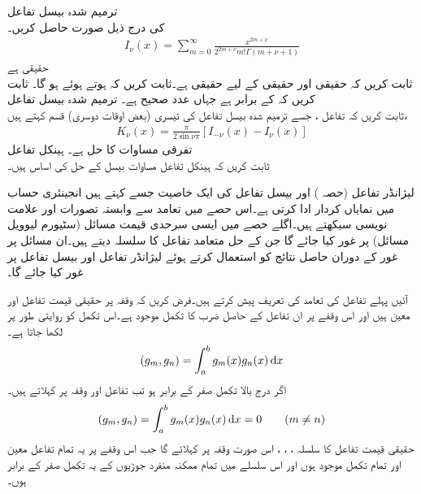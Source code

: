 \quad ترمیم شدہ بیسل تفاعل\\
 کی درج ذیل صورت حاصل کریں۔
\begin{align}
I_{\nu}(x)=\sum_{m=0}^{\infty}\frac{x^{2m+\nu}}{2^{2m+\nu}m!\Gamma(m+\nu+1)}
\end{align}
\quad {} حقیقی ہے\\
ثابت کریں کہ حقیقی  اور حقیقی  کے لیے  حقیقی ہے۔ثابت کریں کہ  ہوتے ہوئے  ہو گا۔ ثابت کریں کہ  کے برابر ہے جہاں  عدد صحیح ہے۔
\quad ترمیم شدہ بیسل تفاعل\\
ثابت کریں کہ تفاعل ، جسے ترمیم شدہ بیسل تفاعل کی تیسری (بعض اوقات دوسری) قسم کہتے ہیں،
\begin{align}
K_{\nu}(x)=\frac{\pi}{2\sin \nu\pi}[I_{-\nu}(x)-I_{\nu}(x)]
\end{align}
تفرقی مساوات  کا حل ہے۔ 
\quad ہینکل تفاعل\\
ثابت کریں کہ ہینکل تفاعل  مساوات بیسل کے حل کی اساس ہیں۔ 

لیژانڈر تفاعل (حصہ ) اور بیسل تفاعل کی ایک خاصیت جسے  کہتے ہیں انجینئری حساب میں نمایاں کردار ادا کرتی ہے۔اس حصے میں تعامد سے وابستہ تصورات اور  علامت نویسی سیکھتے ہیں۔اگلے حصے میں  ایسی سرحدی قیمت مسائل (سٹیورم لیوویل مسائل) پر غور کیا جائے گا جن کے حل متعامد تفاعل کا سلسلہ دیتے ہیں۔ان مسائل  پر غور کے دوران حاصل نتائج کو استعمال کرتے ہوئے لیژانڈر تفاعل اور بیسل تفاعل پر غور کیا جائے گا۔

آئیں پہلے تفاعل کی تعامد کی تعریف پیش کرتے ہیں۔فرض کریں کہ وقفہ  پر حقیقی قیمت تفاعل  اور  معین ہیں اور اس وقفے پر ان تفاعل کے حاصل ضرب  کا تکمل موجود ہے۔اس تکمل کو روایتی طور پر  لکھا جاتا ہے۔
\begin{align}
(g_m,g_n)=\int_{a}^{b} g_m(x)g_n(x)\dif x
\end{align}
اگر درج بالا تکمل صفر کے برابر ہو تب تفاعل  اور  وقفہ  پر   کہلاتے ہیں۔
\begin{align}
(g_m,g_n)=\int_{a}^{b} g_m(x)g_n(x)\dif x=0\quad \quad (m \ne n)
\end{align}
حقیقی قیمت تفاعل کا سلسلہ ، ، ،  اس صورت وقفہ   پر   کہلائے گا جب اس وقفے پر یہ تمام تفاعل معین اور تمام تکمل  موجود ہوں اور اس سلسلے میں تمام ممکنہ منفرد جوڑیوں کے یہ تکمل صفر کے برابر ہوں۔ 


